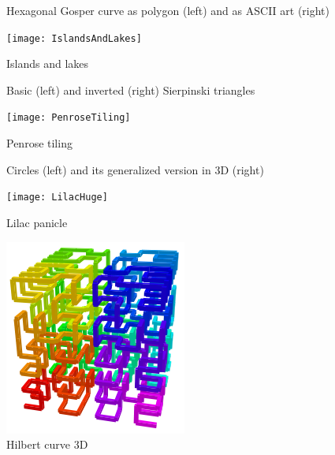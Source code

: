 \begin{figure}[p]
	\hfill
	\subfloat{
		\usebox{\lstBoxGosper}
	}
	\caption{Hexagonal Gosper curve as polygon (left) and as ASCII art (right)}
\end{figure}

\begin{figure}[p]
	\centering
	\texttt{[image: IslandsAndLakes]}
	\caption{Islands and lakes}
	\label{fig:rsltIslandsLakes}
\end{figure}

\begin{figure}[p]
	\hfill
	\caption{Basic (left) and inverted (right) Sierpinski triangles}
	\label{fig:rsltSierpinski}
\end{figure}

\begin{figure}[p]
	\centering
	\texttt{[image: PenroseTiling]}
	\caption{Penrose tiling}
	\label{fig:rsltPenrose}
\end{figure}

\begin{figure}[p]
	\hfill
	\caption{Circles (left) and its generalized version in 3D (right)}
	\label{fig:rsltCircles}
\end{figure}

\begin{figure}[p]
	\centering
	\texttt{[image: LilacHuge]}
	\caption{Lilac panicle}
	\label{fig:rsltLilac}
\end{figure}	

\begin{figure}[p]
	\centering
	\includegraphics[width=\linewidth]{Hilbert3D}
	\caption{Hilbert curve 3D}
	\label{fig:rsltHilbert}
\end{figure}

